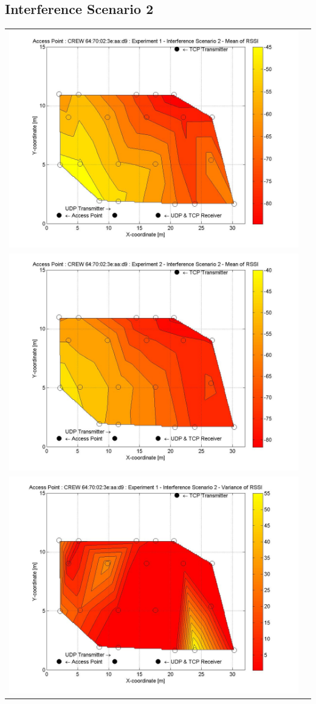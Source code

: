 \documentclass[11pt,a4paper,headinclude,footinclude,chapterprefix=on]{scrreprt}
\begin{document}
\subsection{Interference Scenario 2} 
\begin{longtable}
	{lr} 
	\includegraphics[width=13cm]{../../Source/plot/CREW_d9/d9_Wifi_Ex_1_Mean.jpg} \\
	\includegraphics[width=13cm]{../../Source/plot/CREW_d9/d9_Wifi_Ex_2_Mean.jpg} \\
	\includegraphics[width=13cm]{../../Source/plot/CREW_d9/d9_Wifi_Ex_1_Variance.jpg} \\

\end{longtable}
\end{document}
